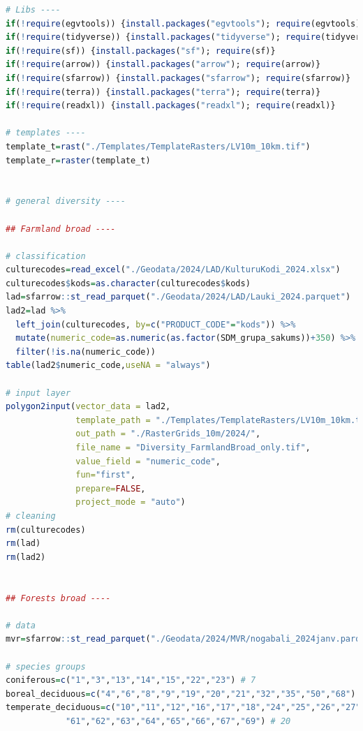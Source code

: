 \documentclass[
]{book}
\begin{document}
\begin{lstlisting}[language=R]
# Libs ----
if(!require(egvtools)) {install.packages("egvtools"); require(egvtools)}
if(!require(tidyverse)) {install.packages("tidyverse"); require(tidyverse)}
if(!require(sf)) {install.packages("sf"); require(sf)}
if(!require(arrow)) {install.packages("arrow"); require(arrow)}
if(!require(sfarrow)) {install.packages("sfarrow"); require(sfarrow)}
if(!require(terra)) {install.packages("terra"); require(terra)}
if(!require(readxl)) {install.packages("readxl"); require(readxl)}

# templates ----
template_t=rast("./Templates/TemplateRasters/LV10m_10km.tif")
template_r=raster(template_t)


# general diversity ----

## Farmland broad ----

# classification 
culturecodes=read_excel("./Geodata/2024/LAD/KulturuKodi_2024.xlsx")
culturecodes$kods=as.character(culturecodes$kods)
lad=sfarrow::st_read_parquet("./Geodata/2024/LAD/Lauki_2024.parquet")
lad2=lad %>% 
  left_join(culturecodes, by=c("PRODUCT_CODE"="kods")) %>% 
  mutate(numeric_code=as.numeric(as.factor(SDM_grupa_sakums))+350) %>% 
  filter(!is.na(numeric_code))
table(lad2$numeric_code,useNA = "always")

# input layer
polygon2input(vector_data = lad2,
              template_path = "./Templates/TemplateRasters/LV10m_10km.tif",
              out_path = "./RasterGrids_10m/2024/",
              file_name = "Diversity_FarmlandBroad_only.tif",
              value_field = "numeric_code",
              fun="first",
              prepare=FALSE,
              project_mode = "auto")
# cleaning
rm(culturecodes)
rm(lad)
rm(lad2)


## Forests broad ----

# data
mvr=sfarrow::st_read_parquet("./Geodata/2024/MVR/nogabali_2024janv.parquet")

# species groups
coniferous=c("1","3","13","14","15","22","23") # 7
boreal_deciduous=c("4","6","8","9","19","20","21","32","35","50","68") # 11
temperate_deciduous=c("10","11","12","16","17","18","24","25","26","27","28","29",
            "61","62","63","64","65","66","67","69") # 20


\end{lstlisting}
\end{document}
